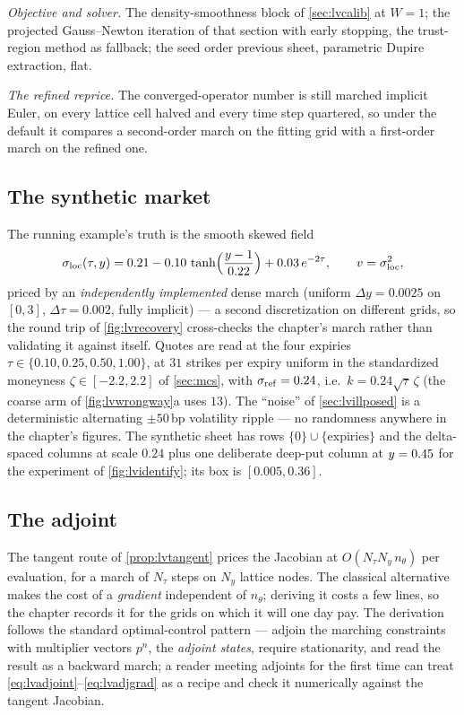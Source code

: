 \emph{Objective and solver.}  The density-smoothness block of
\cref{sec:lvcalib} at $W=1$; the projected Gauss--Newton iteration of
that section with early stopping, the trust-region method as fallback;
the seed order previous sheet, parametric Dupire extraction, flat.

\emph{The refined reprice.}  The converged-operator number is still
marched implicit Euler, on every lattice cell halved and every time
step quartered, so under the default it compares a second-order march
on the fitting grid with a first-order march on the refined one.

\subsection{The synthetic market}
\label{app:lvsynthetic}

The running example's truth is the smooth skewed field
\[
\sigma_{\rm loc}(\tau,y)
=0.21-0.10\,\tanh\!\Big(\frac{y-1}{0.22}\Big)
+0.03\,e^{-2\tau},
\qquad v=\sigma_{\rm loc}^{2},
\]
priced by an \emph{independently implemented} dense march (uniform
$\Delta y=0.0025$ on $[0,3]$, $\Delta\tau=0.002$, fully implicit) --- a
second discretization on different grids, so the round trip of
\cref{fig:lvrecovery} cross-checks the chapter's march rather than
validating it against itself.  Quotes are read at the four expiries
$\tau\in\{0.10,0.25,0.50,1.00\}$, at $31$ strikes per expiry uniform in
the standardized moneyness $\zeta\in[-2.2,2.2]$ of \cref{sec:mcs}, with
$\sigma_{\rm ref}=0.24$, i.e.\ $k=0.24\sqrt{\tau}\,\zeta$ (the coarse arm
of \cref{fig:lvwrongway}a uses $13$).  The ``noise'' of
\cref{sec:lvillposed} is a deterministic alternating
$\pm50$\,bp volatility ripple --- no randomness anywhere in the chapter's
figures.  The synthetic sheet has rows $\{0\}\cup\{\text{expiries}\}$ and
the delta-spaced columns at scale $0.24$ plus one deliberate deep-put
column at $y=0.45$ for the experiment of
\cref{fig:lvidentify}; its box is $[0.005,0.36]$.

\subsection{The adjoint}
\label{app:lvadjoint}

The tangent route of \cref{prop:lvtangent} prices the Jacobian at
$O(N_\tau N_y\,n_\theta)$ per evaluation, for a march of $N_\tau$ steps on
$N_y$ lattice nodes.  The classical alternative makes the cost of a
\emph{gradient} independent of $n_\theta$; deriving it costs a few lines,
so the chapter records it for the grids on which it will one day pay.
The derivation follows the standard optimal-control pattern ---
adjoin the marching constraints with multiplier vectors $p^{n}$, the
\emph{adjoint states}, require stationarity, and read the result as a
backward march; a reader meeting adjoints for the first time can treat
\eqref{eq:lvadjoint}--\eqref{eq:lvadjgrad} as a recipe and check it
numerically against the tangent Jacobian.

